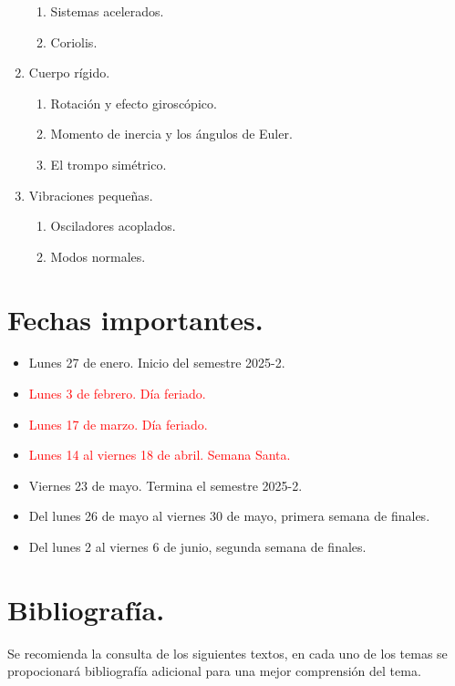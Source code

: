 \documentclass[hidelinks,12pt]{article}
\begin{document}
\begin{enumerate}
\begin{enumerate}
    \item Sistemas acelerados.
    \item Coriolis.
\end{enumerate}
\item Cuerpo rígido.
\begin{enumerate}
    \item Rotación y efecto giroscópico.
    \item Momento de inercia y los ángulos de Euler.
    \item El trompo simétrico.
\end{enumerate}
\item Vibraciones pequeñas.
\begin{enumerate}
    \item Osciladores acoplados.
    \item Modos normales.
\end{enumerate}
\end{enumerate}

\section{Fechas importantes.}

\begin{itemize}
\setlength\itemsep{1pt}
\item Lunes 27 de enero. Inicio del semestre 2025-2.
\item \textcolor{red}{Lunes 3 de febrero. Día feriado.}
\item \textcolor{red}{Lunes 17 de marzo. Día feriado.}
\item \textcolor{red}{Lunes 14 al viernes 18 de abril. Semana Santa.}
\item Viernes 23 de mayo. Termina el semestre 2025-2.
\item Del lunes 26 de mayo al viernes 30 de mayo, primera semana de finales.
\item Del lunes 2 al viernes 6 de junio, segunda semana de finales.
\end{itemize}

\section{Bibliografía.}

Se recomienda la consulta de los siguientes textos, en cada uno de los temas se propocionará bibliografía adicional para una mejor comprensión del tema.
\nocite{*}
\printbibliography
\end{document}
